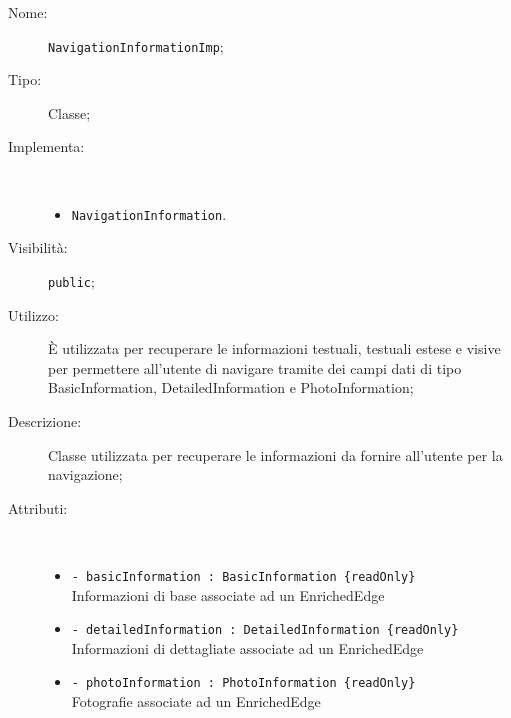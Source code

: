 \documentclass[../DefinizioneDiProdotto.tex]{subfiles}
\begin{document}
\begin{description}
	\item[Nome:] \texttt{NavigationInformationImp};
	\item[Tipo:] Classe;
	\item[Implementa:] \
	\begin{itemize}
		\item \texttt{NavigationInformation}.
		
	\end{itemize}
	\item[Visibilità:] \texttt{public};
	\item[Utilizzo:] È utilizzata per recuperare le informazioni testuali, testuali estese e visive per permettere all'utente di navigare tramite dei campi dati di tipo BasicInformation, DetailedInformation e PhotoInformation;
	\item[Descrizione:] Classe utilizzata per recuperare le informazioni da fornire all'utente per la navigazione;
	\item[Attributi:] \
	\begin{itemize}
		\item \texttt{- basicInformation : BasicInformation \{readOnly\}}\\
		Informazioni di base associate ad un EnrichedEdge
		
		\item \texttt{- detailedInformation : DetailedInformation \{readOnly\}}\\
		Informazioni di dettagliate associate ad un EnrichedEdge
		
		\item \texttt{- photoInformation : PhotoInformation \{readOnly\}}\\
		Fotografie associate ad un EnrichedEdge
		

\end{itemize}
\end{description}
\end{document}
